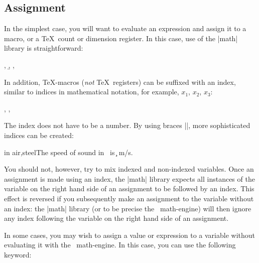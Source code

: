 \subsection{Assignment}
  
  In the simplest case, you will want to evaluate an expression
  and assign it to a macro, or a \TeX\ count or dimension register.
  In this case, use of the |math| library is straightforward:

\begin{codeexample}[]
\newcount\mycount
\newdimen\mydimen
{}
\a, \b, \the\mycount, \the\mydimen
\end{codeexample}


  In addition, \TeX-macros (\emph{not} \TeX\ registers)
  can be suffixed with an index, similar to
  indices in mathematical notation, for example, $x_1$, $x_2$, $x_3$:
  
\begin{codeexample}[]
, , 
\end{codeexample}

  The index does not have to be a number. By using braces |{}|,
  more sophisticated indices can be created:
  
\begin{codeexample}[]
\foreach \medium in {air,steel}{The speed of sound in \medium\ is \c{\medium} m/s. }
\end{codeexample}

  You should not, however, try to mix indexed and non-indexed variables. Once
  an assignment is made using an index, the |math| library expects
  all instances of the variable on the right hand side of an assignment 
  to be followed by an index. This effect is reversed if you
  subsequently make an assignment to the variable without an index: the |math| library
  (or to be precise the \pgfname\ math-engine)
  will then ignore any index following the variable on the right hand side
  of an assignment.

  In some cases, you may wish to assign a value or expression to a variable
  without evaluating it with the \pgfname\ math-engine. In this case, you
  can use the following keyword:

  
